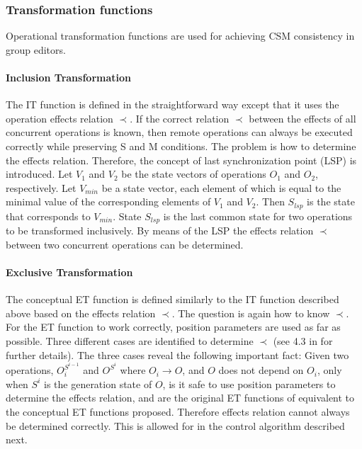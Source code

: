 \subsubsection{Transformation functions}
Operational transformation functions are used for achieving CSM consistency in group editors.

\paragraph{Inclusion Transformation}
The IT function is defined in the straightforward way except that it uses the operation effects relation $\prec$. If the correct relation $\prec$ between the effects of all concurrent operations is known, then remote operations can always be executed correctly while preserving S and M conditions. The problem is how to determine the effects relation. Therefore, the concept of last synchronization point (LSP) is introduced. Let $V_{1}$ and $V_{2}$ be the state vectors of operations $O_{1}$ and $O_{2}$, respectively. Let $V_{min}$ be a state vector, each element of which is equal to the minimal value of the corresponding elements of $V_{1}$ and $V_{2}$. Then $S_{lsp}$ is the state that corresponds to $V_{min}$. State $S_{lsp}$ is the last common state for two operations to be transformed inclusively. By means of the LSP the effects relation $\prec$ between two concurrent operations can be determined.

\paragraph{Exclusive Transformation}
The conceptual ET function is defined similarly to the IT function described above based on the effects relation $\prec$. The question is again how to know $\prec$. For the ET function to work correctly, position parameters are used as far as possible. Three different cases are identified to determine $\prec$ (see 4.3 in \cite{li04} for further details). The three cases reveal the following important fact: Given two operations, $O_i^{S^{i-1}}$ and $O^{S^i}$ where $O_i \rightarrow O$, and $O$ does not depend on $O_i$, only when $S^i$ is the generation state of $O$, is it safe to use position parameters to determine the effects relation, and are the original ET functions of \cite{sun98a} equivalent to the conceptual ET functions proposed. Therefore effects relation cannot always be determined correctly. This is allowed for in the control algorithm described next.

